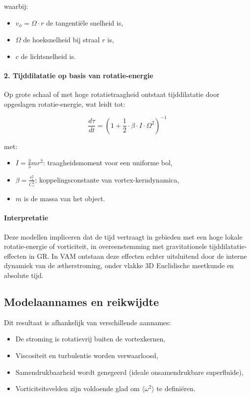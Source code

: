 waarbij:
\begin{itemize}
    \item \( v_\phi = \Omega \cdot r \) de tangentiële snelheid is,
    \item \( \Omega \) de hoeksnelheid bij straal \( r \) is,
    \item \( c \) de lichtsnelheid is.
\end{itemize}

\paragraph{2. Tijddilatatie op basis van rotatie-energie}

Op grote schaal of met hoge rotatietraagheid ontstaat tijddilatatie door opgeslagen rotatie-energie, wat leidt tot:

\begin{equation}
    \frac{d\tau}{dt} =
    \left(1 + \frac{1}{2} \cdot \beta \cdot I \cdot \Omega^2 \right)^{-1}
\end{equation}

met:
\begin{itemize}
    \item \( I = \frac{2}{5} m r^2 \): traagheidsmoment voor een uniforme bol,
    \item \( \beta = \frac{r_c^2}{C_e^2} \): koppelingsconstante van vortex-kerndynamica,
    \item \( m \) is de massa van het object. \end{itemize}

\paragraph{Interpretatie}

Deze modellen impliceren dat de tijd vertraagt in gebieden met een hoge lokale rotatie-energie of vorticiteit, in overeenstemming met gravitationele tijddilatatie-effecten in GR. In VAM ontstaan deze effecten echter uitsluitend door de interne dynamiek van de ætherstroming, onder vlakke 3D Euclidische meetkunde en absolute tijd.


\subsection{Modelaannames en reikwijdte}

Dit resultaat is afhankelijk van verschillende aannames:
\begin{itemize}
\item De stroming is rotatievrij buiten de vortexkernen,
\item Viscositeit en turbulentie worden verwaarloosd,
\item Samendrukbaarheid wordt genegeerd (ideale onsamendrukbare superfluïde),
\item Vorticiteitsvelden zijn voldoende glad om $\langle \omega^2 \rangle$ te definiëren.
\end{itemize}


